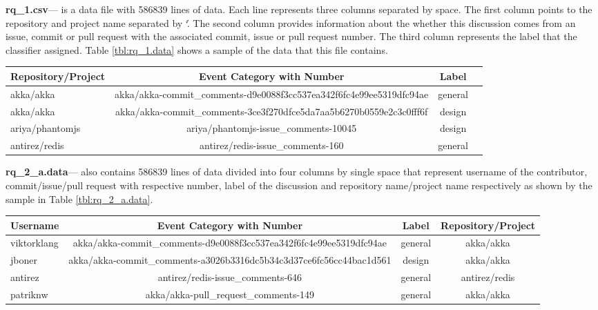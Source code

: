 \noindent\textbf{rq\_1.csv}--- is a data file with 586839 lines of data. Each line represents three columns separated by space. The first column points to the repository and project name separated by `\'. The second column provides information about the whether this discussion comes from an issue, commit or pull request with the associated commit, issue or pull request number. The third column represents the label that the classifier assigned. Table \ref{tbl:rq_1.data} shows a sample of the data that this file contains.
\begin{table*}
	\centering
	\caption{Data sample in rq\_1.data}
	\label{tbl:rq_1.data}
	\begin{tabular}{lccc} 
		\toprule
		\textbf{Repository/Project} & \textbf{Event Category with Number}  & \textbf{Label}  \\
		\midrule
		akka/akka & akka/akka-commit\_comments-d9e0088f3cc537ea342f6fc4e99ee5319dfc94ae & general \\
		akka/akka & akka/akka-commit\_comments-3ce3f270dfce5da7aa5b6270b0559e2c3c0fff6f & design \\
		ariya/phantomjs & ariya/phantomjs-issue\_comments-10045 & design \\
		antirez/redis & antirez/redis-issue\_comments-160 & general \\
		\bottomrule
	\end{tabular}
\end{table*}

\noindent\textbf{rq\_2\_a.data}--- also contains 586839 lines of data divided into four columns by single space that represent username of the contributor, commit/issue/pull request with respective number, label of the discussion and repository name/project name respectively as shown by the sample in Table \ref{tbl:rq_2_a.data}.
\begin{table*}
	\centering
	\caption{Data sample in rq\_2\_a.data}
	\label{tbl:rq_2_a.data}
	\begin{tabular}{lccc} 
		\toprule
		\textbf{Username} & \textbf{Event Category with Number}  & \textbf{Label} & \textbf{Repository/Project}  \\
		\midrule
		viktorklang & akka/akka-commit\_comments-d9e0088f3cc537ea342f6fc4e99ee5319dfc94ae & general & akka/akka \\
		jboner & akka/akka-commit\_comments-a3026b3316dc5b34c3d37ce6fc56cc44bac1d561 & design & akka/akka \\
		antirez & antirez/redis-issue\_comments-646 & general & antirez/redis \\
		patriknw & akka/akka-pull\_request\_comments-149 & general & akka/akka \\
		\bottomrule
	\end{tabular}
\end{table*}


